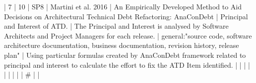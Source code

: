 |  7 |         10 | SP8  | Martini et al. 2016                                                  | An Empirically Developed Method to Aid Decisions on Architectural Technical Debt Refactoring: AnaConDebt                                                                 | Principal and Interest of ATD.                                                                                                                                                                                                                             | The Principal and Interest is analysed by Software Architects and Project Managers for each release.                                                                                                                                                               | general:"source code, software architecture documentation, business documentation, revision history, release plan"                                                                                                                                                                                       | Using particular formulas created by AnaConDebt framework related to principal and interest to calculate the effort to fix the ATD Item identified.                                                                                                                                                                                                                                                                                                                                      |
|    |            |      |                                                                      |                                                                                                                                                                          |                                                                                                                                                                                                                                                            |                                                                                                                                                                                                                                                                      |  #                                                                                                                                                                                                                                                                                                       |                                                                                                                                                                                                                                                                                                                                                                                                                                                                                              |
